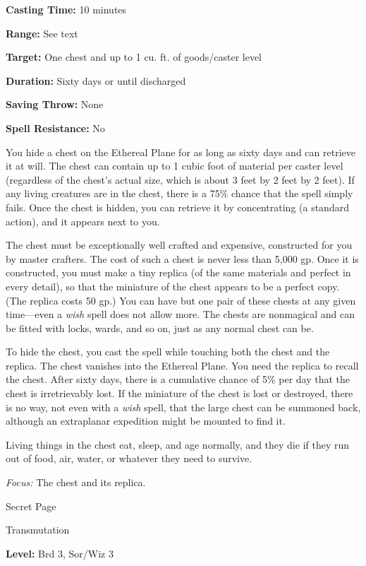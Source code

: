\documentclass{article}
\begin{document}
\textbf{Casting Time:} 10 minutes

\textbf{Range:} See text

\textbf{Target:} One chest and up to 1 cu. ft. of goods/caster level

\textbf{Duration:} Sixty days or until discharged

\textbf{Saving Throw:} None

\textbf{Spell Resistance:} No

You hide a chest on the Ethereal Plane for as long as sixty days and can retrieve 
it at will. The chest can contain up to 1 cubic foot of material per caster level 
(regardless of the chest's actual size, which is about 3 feet by 2 feet by 2 feet). 
If any living creatures are in the chest, there is a 75\% chance that the spell 
simply fails. Once the chest is hidden, you can retrieve it by concentrating (a 
standard action), and it appears next to you.

The chest must be exceptionally well crafted and expensive, constructed for you 
by master crafters. The cost of such a chest is never less than 5,000 gp. Once 
it is constructed, you must make a tiny replica (of the same materials and perfect 
in every detail), so that the miniature of the chest appears to be a perfect copy. 
(The replica costs 50 gp.) You can have but one pair of these chests at any given 
time---even a \textit{wish }spell does not allow more. The chests are nonmagical 
and can be fitted with locks, wards, and so on, just as any normal chest can be.

To hide the chest, you cast the spell while touching both the chest and the replica. 
The chest vanishes into the Ethereal Plane. You need the replica to recall the 
chest. After sixty days, there is a cumulative chance of 5\% per day that the chest 
is irretrievably lost. If the miniature of the chest is lost or destroyed, there 
is no way, not even with a \textit{wish }spell, that the large chest can be summoned 
back, although an extraplanar expedition might be mounted to find it.

Living things in the chest eat, sleep, and age normally, and they die if they run 
out of food, air, water, or whatever they need to survive.

\textit{Focus: }The chest and its replica.

\vspace{12pt}
Secret Page

Transmutation

\textbf{Level:} Brd 3, Sor/Wiz 3
\end{document}
